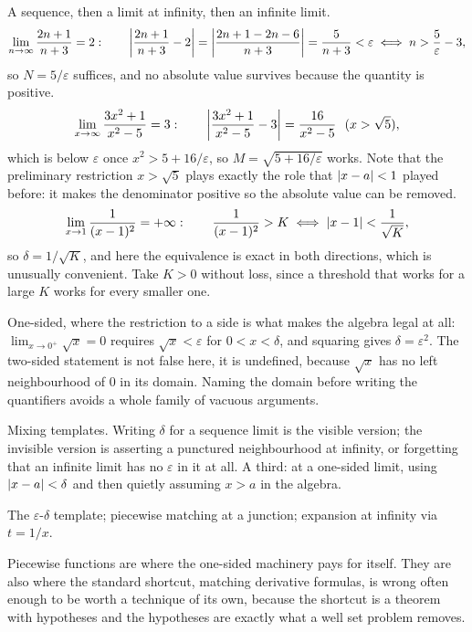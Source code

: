 \begin{worked}
A sequence, then a limit at infinity, then an infinite limit.
\[\lim_{n\to\infty}\frac{2n+1}{n+3}=2:\qquad \left\lvert \frac{2n+1}{n+3}-2\right\rvert=\left\lvert \frac{2n+1-2n-6}{n+3}\right\rvert=\frac{5}{n+3}<\varepsilon\iff n>\frac5\varepsilon-3 ,\]
so $N=5/\varepsilon$ suffices, and no absolute value survives because the quantity is positive.
\[\lim_{x\to\infty}\frac{3x^{2}+1}{x^{2}-5}=3:\qquad \abs{\frac{3x^{2}+1}{x^{2}-5}-3}=\frac{16}{x^{2}-5}\ \ (x>\sqrt5),\]
which is below $\varepsilon$ once $x^{2}>5+16/\varepsilon$, so $M=\sqrt{5+16/\varepsilon}$ works. Note that the preliminary restriction $x>\sqrt5$ plays exactly the role that $\left\lvert x-a\right\rvert<1$ played before: it makes the denominator positive so the absolute value can be removed.
\[\lim_{x\to1}\frac{1}{(x-1)^{2}}=+\infty:\qquad \frac{1}{(x-1)^{2}}>K\iff\left\lvert x-1\right\rvert<\frac{1}{\sqrt K},\]
so $\delta=1/\sqrt K$, and here the equivalence is exact in both directions, which is unusually convenient. Take $K>0$ without loss, since a threshold that works for a large $K$ works for every smaller one.

One-sided, where the restriction to a side is what makes the algebra legal at all: $\lim_{x\to0^{+}}\sqrt x=0$ requires $\sqrt x<\varepsilon$ for $0<x<\delta$, and squaring gives $\delta=\varepsilon^{2}$. The two-sided statement is not false here, it is undefined, because $\sqrt x$ has no left neighbourhood of $0$ in its domain. Naming the domain before writing the quantifiers avoids a whole family of vacuous arguments.
\end{worked}

\begin{trap}
Mixing templates. Writing $\delta$ for a sequence limit is the visible version; the invisible version is asserting a punctured neighbourhood at infinity, or forgetting that an infinite limit has no $\varepsilon$ in it at all. A third: at a one-sided limit, using $\left\lvert x-a\right\rvert<\delta$ and then quietly assuming $x>a$ in the algebra.
\end{trap}

\begin{seealsob}The $\varepsilon$-$\delta$ template; piecewise matching at a junction; expansion at infinity via $t=1/x$.\end{seealsob}

Piecewise functions are where the one-sided machinery pays for itself. They are also where the standard shortcut, matching derivative formulas, is wrong often enough to be worth a technique of its own, because the shortcut is a theorem with hypotheses and the hypotheses are exactly what a well set problem removes.

